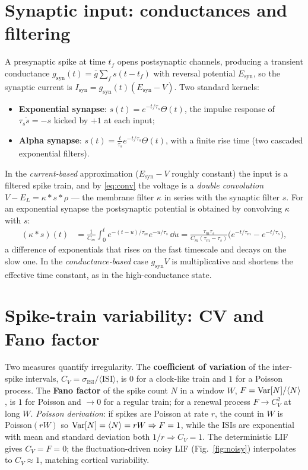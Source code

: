 \documentclass[11pt]{article}
\begin{document}
\section{Synaptic input: conductances and filtering}
A presynaptic spike at time $t_f$ opens postsynaptic channels, producing a transient conductance
$g_{\mathrm{syn}}(t)=\bar g\sum_f s(t-t_f)$ with reversal potential $E_{\mathrm{syn}}$, so the
synaptic current is $I_{\mathrm{syn}}=g_{\mathrm{syn}}(t)(E_{\mathrm{syn}}-V)$. Two standard kernels:
\begin{itemize}[leftmargin=1.6em]
  \item \textbf{Exponential synapse}: $s(t)=e^{-t/\tau_s}\Theta(t)$, the impulse response of
  $\tau_s\dot s=-s$ kicked by $+1$ at each input;
  \item \textbf{Alpha synapse}: $s(t)=\frac{t}{\tau_s}e^{-t/\tau_s}\Theta(t)$, with a finite rise
  time (two cascaded exponential filters).
\end{itemize}
In the \emph{current-based} approximation ($E_{\mathrm{syn}}-V$ roughly constant) the input is a
filtered spike train, and by \eqref{eq:conv} the voltage is a \emph{double convolution}
$V-E_L=\kappa*s*\rho$ --- the membrane filter $\kappa$ in series with the synaptic filter $s$.
For an exponential synapse the postsynaptic potential is obtained by convolving $\kappa$ with $s$:
\begin{align}
  (\kappa*s)(t)&=\frac{1}{C_m}\int_0^t e^{-(t-u)/\tau_m}e^{-u/\tau_s}\,\dd u
   =\frac{\tau_m\tau_s}{C_m(\tau_m-\tau_s)}\big(e^{-t/\tau_m}-e^{-t/\tau_s}\big),
\end{align}
a difference of exponentials that rises on the fast timescale and decays on the slow one. In the
\emph{conductance-based} case $g_{\mathrm{syn}}V$ is multiplicative and shortens the effective time
constant, as in the high-conductance state.

\section{Spike-train variability: CV and Fano factor}
Two measures quantify irregularity. The \textbf{coefficient of variation} of the inter-spike
intervals, $C_V=\sigma_{\mathrm{ISI}}/\langle\mathrm{ISI}\rangle$, is $0$ for a clock-like train and
$1$ for a Poisson process. The \textbf{Fano factor} of the spike count $N$ in a window $W$,
$F=\operatorname{Var}[N]/\langle N\rangle$, is $1$ for Poisson and $\to0$ for a regular train; for a renewal
process $F\to C_V^2$ at long $W$. \emph{Poisson derivation}: if spikes are Poisson at rate $r$, the
count in $W$ is Poisson$(rW)$ so $\operatorname{Var}[N]=\langle N\rangle=rW\Rightarrow F=1$, while the ISIs are
exponential with mean and standard deviation both $1/r\Rightarrow C_V=1$. The deterministic LIF
gives $C_V=F=0$; the fluctuation-driven noisy LIF (Fig.~\ref{fig:noisy}) interpolates to
$C_V\approx1$, matching cortical variability.
\end{document}
